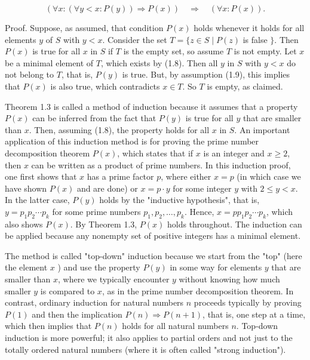 \documentclass[12pt]{article}
\begin{document}
\begin{equation*}
(\forall x:(\forall y<x: P(y)) \Rightarrow P(x)) \quad \Rightarrow \quad(\forall x: P(x)) . \tag{1.9}
\end{equation*}


Proof. Suppose, as assumed, that condition $P(x)$ holds whenever it holds for all elements $y$ of $S$ with $y<x$. Consider the set $T=\{z \in S \mid P(z)$ is false $\}$. Then $P(x)$ is true for all $x$ in $S$ if $T$ is the empty set, so assume $T$ is not empty. Let $x$ be a minimal element of $T$, which exists by (1.8). Then all $y$ in $S$ with $y<x$ do not belong to $T$, that is, $P(y)$ is true. But, by assumption (1.9), this implies that $P(x)$ is also true, which contradicts $x \in T$. So $T$ is empty, as claimed.

Theorem 1.3 is called a method of induction because it assumes that a property $P(x)$ can be inferred from the fact that $P(y)$ is true for all $y$ that are smaller than $x$. Then, assuming (1.8), the property holds for all $x$ in $S$. An important application of this induction method is for proving the prime number decomposition theorem $P(x)$, which states that if $x$ is an integer and $x \geq 2$, then $x$ can be written as a product of prime numbers. In this induction proof, one first shows that $x$ has a prime factor $p$, where either $x=p$ (in which case we have shown $P(x)$ and are done) or $x=p \cdot y$ for some integer $y$ with $2 \leq y<x$. In the latter case, $P(y)$ holds by the "inductive hypothesis", that is, $y=p_{1} p_{2} \cdots p_{k}$ for some prime numbers $p_{1}, p_{2}, \ldots, p_{k}$. Hence, $x=p p_{1} p_{2} \cdots p_{k}$, which also shows $P(x)$. By Theorem 1.3, $P(x)$ holds throughout. The induction can be applied because any nonempty set of positive integers has a minimal element.

The method is called "top-down" induction because we start from the "top" (here the element $x$ ) and use the property $P(y)$ in some way for elements $y$ that are smaller than $x$, where we typically encounter $y$ without knowing how much smaller $y$ is compared to $x$, as in the prime number decomposition theorem. In contrast, ordinary induction for natural numbers $n$ proceeds typically by proving $P(1)$ and then the implication $P(n) \Rightarrow P(n+1)$, that is, one step at a time, which then implies that $P(n)$ holds for all natural numbers $n$. Top-down induction is more powerful; it also applies to partial orders and not just to the totally ordered natural numbers (where it is often called "strong induction").
\end{document}
